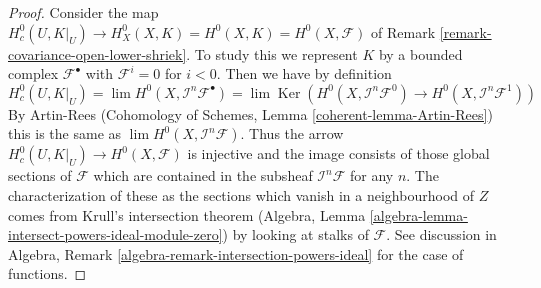 \documentclass[10pt,a4paper]{amsart}
\theoremstyle{plain}
\theoremstyle{definition}
\theoremstyle{remark}
\numberwithin{equation}{subsection}
\def\lim{\mathop{\mathrm{lim}}\nolimits}
\def\Ker{\mathop{\mathrm{Ker}}}
\begin{document}
\begin{proof}
Consider the map
$H^0_c(U, K|_U) \to H^0_X(X, K) = H^0(X, K) = H^0(X, \mathcal{F})$ of
Remark \ref{remark-covariance-open-lower-shriek}. To study this
we represent $K$ by a bounded complex $\mathcal{F}^\bullet$ with
$\mathcal{F}^i = 0$ for $i < 0$. Then we have by definition
$$
H^0_c(U, K|_U) = \lim H^0(X, \mathcal{I}^n\mathcal{F}^\bullet)
= \lim \Ker(
H^0(X, \mathcal{I}^n\mathcal{F}^0) \to
H^0(X, \mathcal{I}^n\mathcal{F}^1))
$$
By Artin-Rees (Cohomology of Schemes, Lemma \ref{coherent-lemma-Artin-Rees})
this is the same as $\lim H^0(X, \mathcal{I}^n\mathcal{F})$.
Thus the arrow $H^0_c(U, K|_U) \to H^0(X, \mathcal{F})$
is injective and the image consists of those global sections of $\mathcal{F}$
which are contained in the subsheaf $\mathcal{I}^n\mathcal{F}$
for any $n$. The characterization of these as the sections which
vanish in a neighbourhood of $Z$ comes from Krull's intersection
theorem (Algebra, Lemma \ref{algebra-lemma-intersect-powers-ideal-module-zero})
by looking at stalks of $\mathcal{F}$. See discussion in
Algebra, Remark \ref{algebra-remark-intersection-powers-ideal}
for the case of functions.
\end{proof}
\end{document}
